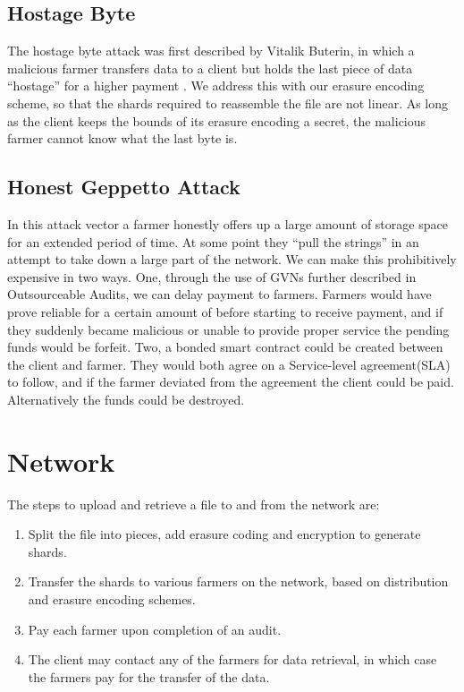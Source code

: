 \documentclass[a4paper,10pt]{article}
\begin{document}
\subsection{Hostage Byte}
The hostage byte attack was first described by Vitalik Buterin, in which a malicious farmer transfers data to a client but holds the last piece of data “hostage” for a higher payment \cite{16}. We address this with our erasure encoding scheme, so that the shards required to reassemble the file are not linear. As long as the client keeps the bounds of its erasure encoding a secret, the malicious farmer cannot know what the last byte is.

\subsection{Honest Geppetto Attack}
In this attack vector a farmer honestly offers up a large amount of storage space for an extended period of time. At some point they “pull the strings” in an attempt to take down a large part of the network. We can make this prohibitively expensive in two ways. One, through the use of GVNs further described in Outsourceable Audits, we can delay payment to farmers. Farmers would have prove reliable for a certain amount of before starting to receive payment, and if they suddenly became malicious or unable to provide proper service the pending funds would be forfeit. Two, a bonded smart contract could be created between the client and farmer. They would both agree on a Service-level agreement(SLA) to follow, and if the farmer deviated from the agreement the client could be paid. Alternatively the funds could be destroyed.

\section{Network}
The steps to upload and retrieve a file to and from the network are:
\begin{enumerate}
\item Split the file into pieces, add erasure coding and encryption to generate shards.
\item Transfer the shards to various farmers on the network, based on distribution and erasure encoding schemes.
\item Pay each farmer upon completion of an audit.
\item The client may contact any of the farmers for data retrieval, in which case the farmers pay for the transfer of the data.
\end{enumerate}
\end{document}
